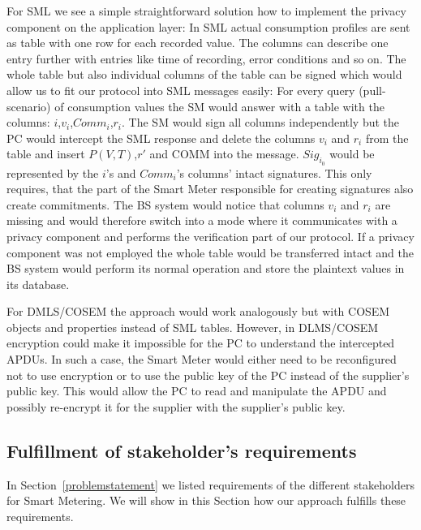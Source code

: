 \documentclass[english]{llncs}
\begin{document}
For SML we see a simple straightforward solution how to implement the privacy component on the application layer:
In SML actual consumption profiles are sent as table with one row for each recorded value. The columns can describe one entry further with entries like time of recording, error conditions and so on. The whole table but also individual columns of the table can be signed which would allow us to fit our protocol into SML messages easily: For every query (pull-scenario) of consumption values the SM would answer with a table with the columns: $i$,$v_i$,$Comm_i$,$r_i$. The SM would sign all columns independently but the PC would intercept the SML response and delete the columns $v_i$ and $r_i$ from the table and insert $P(V,T)$,$r'$ and $\text{COMM}$ into the message. $Sig_{i_0}$ would be represented by the $i$'s and $Comm_i$'s columns' intact signatures. This only requires, that the part of the Smart Meter responsible for creating signatures also create commitments. The BS system would notice that columns $v_i$ and $r_i$ are missing and would therefore switch into a mode where it communicates with a privacy component and performs the verification part of our protocol. If a privacy component was not employed the whole table would be transferred intact and the BS system would perform its normal operation and store the plaintext values in its database.
 
For DMLS/COSEM the approach would work analogously but with COSEM objects and properties instead of SML tables. However, in DLMS/COSEM encryption could make it impossible for the PC to understand the intercepted APDUs. In such a case, the Smart Meter would either need to be reconfigured not to use encryption or to use the public key of the PC instead of the supplier's public key.
This would allow the PC to read and manipulate the APDU and possibly re-encrypt it for the supplier with the supplier's public key. 


\subsection{Fulfillment of stakeholder's requirements}
In Section~\ref{problemstatement} we listed requirements of the different stakeholders for Smart Metering.
We will show in this Section how our approach fulfills these requirements.
\end{document}
